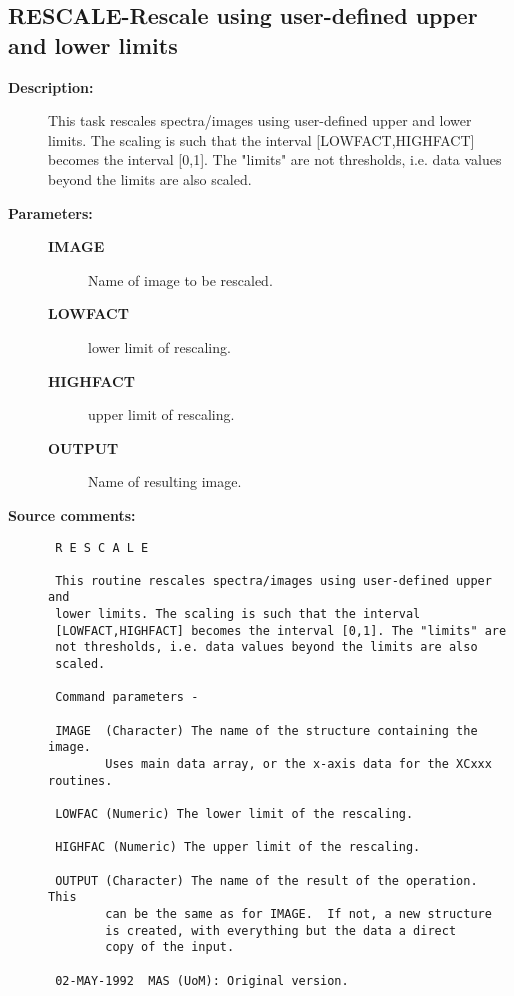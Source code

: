 \subsection{RESCALE-\label{RESCALE}Rescale using user-defined upper and lower limits}
\begin{description}

\item [{\bf Description:}]
 This task rescales spectra/images using user-defined upper
 and lower limits.  The scaling is such that the interval
 [LOWFACT,HIGHFACT] becomes the interval [0,1]. The "limits"
 are not thresholds, i.e. data values beyond the limits are
 also scaled.

\item [{\bf Parameters:}]
\begin{description}
\item [{\bf IMAGE}]
 Name of image to be rescaled.
\item [{\bf LOWFACT}]
 lower limit of rescaling.
\item [{\bf HIGHFACT}]
 upper limit of rescaling.
\item [{\bf OUTPUT}]
 Name of resulting image.
\end{description}

\item [{\bf Source comments:}]
\begin{verbatim}
 R E S C A L E

 This routine rescales spectra/images using user-defined upper and
 lower limits. The scaling is such that the interval
 [LOWFACT,HIGHFACT] becomes the interval [0,1]. The "limits" are
 not thresholds, i.e. data values beyond the limits are also
 scaled.

 Command parameters -

 IMAGE  (Character) The name of the structure containing the image.
        Uses main data array, or the x-axis data for the XCxxx routines.

 LOWFAC (Numeric) The lower limit of the rescaling.

 HIGHFAC (Numeric) The upper limit of the rescaling.

 OUTPUT (Character) The name of the result of the operation.  This
        can be the same as for IMAGE.  If not, a new structure
        is created, with everything but the data a direct
        copy of the input.

 02-MAY-1992  MAS (UoM): Original version.
\end{verbatim}
\end{description}
